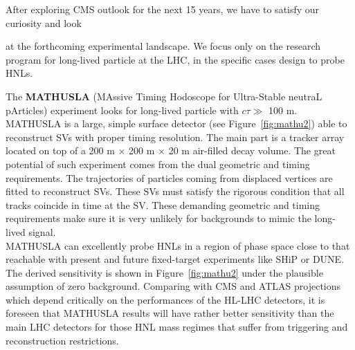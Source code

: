 After exploring CMS outlook for the next 15 years, we have to satisfy
our curiosity and look

 at the forthcoming experimental landscape. We
focus only on the research program for long-lived particle at the LHC,
in the specific cases design to probe HNLs.

The \textbf{MATHUSLA} (MAssive Timing
Hodoscope for Ultra-Stable neutraL pArticles) experiment looks for
long-lived particle with $c\tau \gg$ 100 m. MATHUSLA is a
large, simple surface detector (see Figure~\ref{fig:mathu2}) able to reconstruct SVs with proper timing
resolution. The main
part is a tracker array located on top of a 200 m $\times$ 200 m
$\times$ 20 m air-filled decay volume.
The great potential of such experiment comes from the dual geometric and timing
requirements. The trajectories of particles coming from displaced
vertices are fitted to reconstruct SVs. These SVs must satisfy the rigorous
condition that all tracks coincide in time at the SV. These demanding geometric and timing
requirements make sure it is very unlikely for backgrounds to mimic
the long-lived signal.\\
MATHUSLA can excellently probe HNLs in a region of phase space close to that reachable
with present and future fixed-target experiments like SHiP or
DUNE. The derived sensitivity is shown in Figure~\ref{fig:mathu2} under
the plausible assumption of zero background. Comparing with CMS and
ATLAS projections which depend critically on the performances of the
HL-LHC detectors, it is foreseen that MATHUSLA results will have rather
better sensitivity than the main LHC detectors for those HNL mass
regimes that suffer from triggering and reconstruction restrictions.
